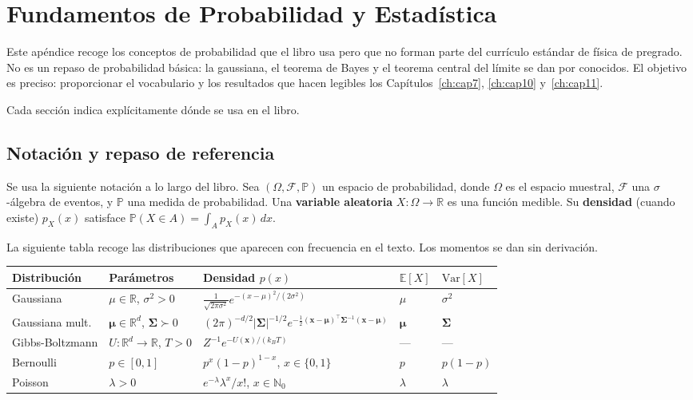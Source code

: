 \chapter{Fundamentos de Probabilidad y Estadística}
\label{ap:probabilidad}

Este apéndice recoge los conceptos de probabilidad que el libro usa pero que no
forman parte del currículo estándar de física de pregrado. No es un repaso de
probabilidad básica: la gaussiana, el teorema de Bayes y el teorema central del
límite se dan por conocidos. El objetivo es preciso: proporcionar el vocabulario
y los resultados que hacen legibles los Capítulos~\ref{ch:cap7},
\ref{ch:cap10} y~\ref{ch:cap11}.

Cada sección indica explícitamente dónde se usa en el libro.

\section{Notación y repaso de referencia}
\label{sec:ap_notacion}

Se usa la siguiente notación a lo largo del libro. Sea $(\Omega, \mathcal{F},
\mathbb{P})$ un espacio de probabilidad, donde $\Omega$ es el espacio muestral,
$\mathcal{F}$ una $\sigma$-álgebra de eventos, y $\mathbb{P}$ una medida de
probabilidad. Una \textbf{variable aleatoria} $X: \Omega \to \mathbb{R}$ es una
función medible. Su \textbf{densidad} (cuando existe) $p_X(x)$ satisface
$\mathbb{P}(X \in A) = \int_A p_X(x)\,dx$.

\medskip
La siguiente tabla recoge las distribuciones que aparecen con frecuencia en el
texto. Los momentos se dan sin derivación.

\begin{center}
\begin{tabular}{lllll}
\toprule
\textbf{Distribución} & \textbf{Parámetros} & \textbf{Densidad $p(x)$}
  & $\mathbb{E}[X]$ & $\mathrm{Var}[X]$ \\
\midrule
Gaussiana & $\mu\in\mathbb{R}$, $\sigma^2>0$
  & $\frac{1}{\sqrt{2\pi\sigma^2}}e^{-(x-\mu)^2/(2\sigma^2)}$
  & $\mu$ & $\sigma^2$ \\[4pt]
Gaussiana mult. & $\bm{\mu}\in\mathbb{R}^d$, $\bm{\Sigma}\succ 0$
  & $(2\pi)^{-d/2}|\bm{\Sigma}|^{-1/2}e^{-\frac{1}{2}(\bm{x}-\bm{\mu})^\top\bm{\Sigma}^{-1}(\bm{x}-\bm{\mu})}$
  & $\bm{\mu}$ & $\bm{\Sigma}$ \\[4pt]
Gibbs-Boltzmann & $U:\mathbb{R}^d\to\mathbb{R}$, $T>0$
  & $Z^{-1}e^{-U(\bm{x})/(k_BT)}$
  & --- & --- \\[4pt]
Bernoulli & $p\in[0,1]$
  & $p^x(1-p)^{1-x}$, $x\in\{0,1\}$
  & $p$ & $p(1-p)$ \\[4pt]
Poisson & $\lambda>0$
  & $e^{-\lambda}\lambda^x/x!$, $x\in\mathbb{N}_0$
  & $\lambda$ & $\lambda$ \\
\bottomrule
\end{tabular}
\end{center}

